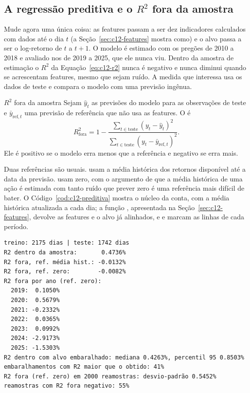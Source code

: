 \subsection{A regressão preditiva e o \texorpdfstring{$R^2$}{R2} fora da amostra}

Mude agora uma única coisa: as features passam a ser dez indicadores calculados com dados até o dia $t$ (a Seção~\ref{sec:c12-features} mostra como) e o alvo passa a ser o log-retorno de $t$ a $t+1$. O modelo é estimado com os pregões de 2010 a 2018 e avaliado nos de 2019 a 2025, que ele nunca viu. Dentro da amostra de estimação o $R^2$ da Equação~\eqref{eq:c12-r2} nunca é negativo e nunca diminui quando se acrescentam features, mesmo que sejam ruído. A medida que interessa usa os dados de teste e compara o modelo com uma previsão ingênua.

\begin{definicao}{$R^2$ fora da amostra}
Sejam $\hat y_t$ as previsões do modelo para as observações de teste e $\bar y_{\text{ref}, t}$ uma previsão de referência que não usa as features. O  é
\begin{equation}
  R^2_{\text{fora}} = 1 - \frac{\sum_{t \in \text{teste}} (y_t - \hat y_t)^2}{\sum_{t \in \text{teste}} (y_t - \bar y_{\text{ref}, t})^2} .
  \label{eq:c12-r2oos}
\end{equation}
Ele é positivo se o modelo erra menos que a referência e negativo se erra mais.
\end{definicao}

Duas referências são usuais. \citet{campbell2008} usam a média histórica dos retornos disponível até a data da previsão. \citet{gu2020} usam zero, com o argumento de que a média histórica de uma ação é estimada com tanto ruído que prever zero é uma referência mais difícil de bater. O Código~\ref{cod:c12-preditiva} mostra o núcleo da conta, com a média histórica atualizada a cada dia; a função , apresentada na Seção~\ref{sec:c12-features}, devolve as features e o alvo já alinhados, e  e  marcam as linhas de cada período.


\begin{lstlisting}[style=saida]
treino: 2175 dias | teste: 1742 dias
R2 dentro da amostra:       0.4736%
R2 fora, ref. média hist.: -0.0132%
R2 fora, ref. zero:        -0.0082%
R2 fora por ano (ref. zero):
  2019:  0.1050%
  2020:  0.5679%
  2021: -0.2332%
  2022:  0.0365%
  2023:  0.0992%
  2024: -2.9173%
  2025: -1.5303%
R2 dentro com alvo embaralhado: mediana 0.4263%, percentil 95 0.8503%
embaralhamentos com R2 maior que o obtido: 41%
R2 fora (ref. zero) em 2000 reamostras: desvio-padrão 0.5452%
reamostras com R2 fora negativo: 55%
\end{lstlisting}

